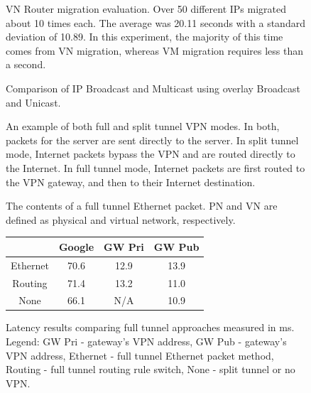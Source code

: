 \begin{figure}[ht]
\centering
{}
\caption[VN Router migration evaluation]{VN Router migration evaluation.  Over
50 different IPs migrated about 10 times each.  The average was 20.11 seconds
with a standard deviation of 10.89.  In this experiment, the majority of this
time comes from VN migration, whereas VM migration requires less than a second.}
\label{fig:mig}
\end{figure}

\begin{figure}[ht]
\centering
\caption{Comparison of IP Broadcast and Multicast using overlay Broadcast and
Unicast.}
\label{fig:broadcast}
\end{figure}

\begin{figure}[ht]
\centering
{}
\caption[An example of both full and split tunnel VPN modes]{An example of both
full and split tunnel VPN modes.  In both, packets for the server are sent
directly to the server.  In split tunnel mode, Internet packets bypass the VPN
and are routed directly to the Internet.  In full tunnel mode, Internet packets
are first routed to the VPN gateway, and then to their Internet destination.}
\label{fig:tunnel}
\end{figure}

\begin{figure}[ht]
\centering
{}
\caption[The contents of a full tunnel Ethernet packet]{The contents of a full
tunnel Ethernet packet.  PN and VN are defined as physical and virtual network,
respectively.}
\label{fig:tunnel_packet}
\end{figure}

\begin{figure}[ht]
\begin{center}
\begin{tabular}{|c||c|c|c|} \hline
& Google & GW Pri & GW Pub \\ \hline \hline
Ethernet & 70.6 & 12.9 & 13.9 \\ \hline
Routing & 71.4 & 13.2 & 11.0 \\ \hline
None & 66.1 & N/A & 10.9 \\ \hline
\end{tabular}
\end{center}
\label{tab:full_tunnel_eval}
\caption[Full tunnel evaluation]{Latency results comparing full tunnel
approaches measured in ms.  Legend: GW Pri - gateway's VPN address, GW Pub -
gateway's VPN address, Ethernet - full tunnel Ethernet packet method, Routing -
full tunnel routing rule switch, None - split tunnel or no VPN.}
\end{figure}

